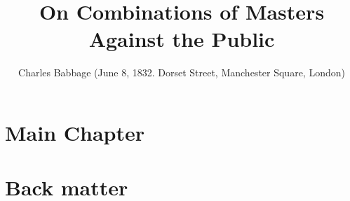 \documentclass[11pt]{book}
\title{On Combinations of Masters Against the Public}
\author{Charles Babbage (June 8, 1832. Dorset Street, Manchester Square, London)}
\begin{document}
\maketitle
\def\title#1{\chapter{#1}}
\tableofcontents

\part{Main Chapter}
        
        
        
        
\part{Back matter}
        
        
        
        
\end{document}
